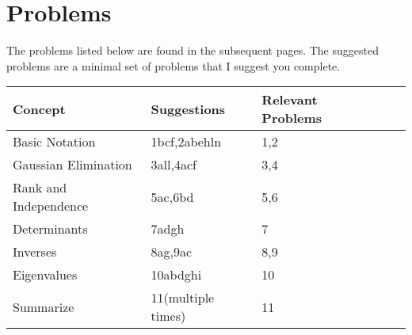 \section{Problems}

The problems listed below are found in the subsequent pages. The suggested problems are a minimal set of problems that I suggest you complete.
\begin{center}
\begin{tabular}{|l|l|l|l|l|}
\hline
Concept&Suggestions&Relevant Problems\\ \hline
Basic Notation&1bcf,2abehln&1,2\\ \hline
Gaussian Elimination&3all,4acf&3,4\\ \hline
Rank and Independence&5ac,6bd&5,6\\ \hline
Determinants&7adgh&7\\ \hline
Inverses&8ag,9ac&8,9\\ \hline
Eigenvalues&10abdghi&10\\ \hline
Summarize&11(multiple times)&11\\ \hline
\end{tabular}
\end{center}

